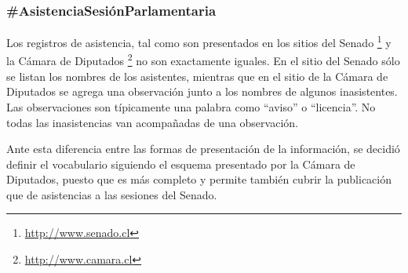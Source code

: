 \subsubsection{\#AsistenciaSesiónParlamentaria}

Los registros de asistencia, tal como son presentados en los
sitios del Senado \footnote{\url{http://www.senado.cl}} y la Cámara de
Diputados \footnote{\url{http://www.camara.cl}} no son exactamente
iguales. En el sitio del Senado sólo se listan los nombres de los
asistentes, mientras que en el sitio de la Cámara de Diputados se
agrega una observación junto a los nombres de algunos
inasistentes. Las observaciones son típicamente una palabra como
``aviso'' o ``licencia''. No todas las inasistencias van acompañadas
de una observación.

Ante esta diferencia entre las formas de presentación de la
información, se decidió definir el vocabulario siguiendo el esquema
presentado por la Cámara de Diputados, puesto que es más completo y
permite también cubrir la publicación que de asistencias a las
sesiones del Senado.

\begin{description}
  
\end{description}